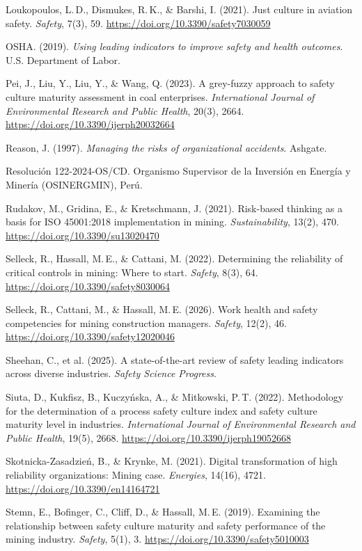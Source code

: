 \documentclass[12pt,a4paper]{article}
\begin{document}
Loukopoulos, L.\,D., Dismukes, R.\,K., \& Barshi, I. (2021). Just culture in aviation safety. \textit{Safety}, 7(3), 59. \url{https://doi.org/10.3390/safety7030059}

OSHA. (2019). \textit{Using leading indicators to improve safety and health outcomes}. U.S. Department of Labor.

Pei, J., Liu, Y., Liu, Y., \& Wang, Q. (2023). A grey-fuzzy approach to safety culture maturity assessment in coal enterprises. \textit{International Journal of Environmental Research and Public Health}, 20(3), 2664. \url{https://doi.org/10.3390/ijerph20032664}

Reason, J. (1997). \textit{Managing the risks of organizational accidents}. Ashgate.

Resolución 122-2024-OS/CD. Organismo Supervisor de la Inversión en Energía y Minería (OSINERGMIN), Perú.

Rudakov, M., Gridina, E., \& Kretschmann, J. (2021). Risk-based thinking as a basis for ISO 45001:2018 implementation in mining. \textit{Sustainability}, 13(2), 470. \url{https://doi.org/10.3390/su13020470}

Selleck, R., Hassall, M.\,E., \& Cattani, M. (2022). Determining the reliability of critical controls in mining: Where to start. \textit{Safety}, 8(3), 64. \url{https://doi.org/10.3390/safety8030064}

Selleck, R., Cattani, M., \& Hassall, M.\,E. (2026). Work health and safety competencies for mining construction managers. \textit{Safety}, 12(2), 46. \url{https://doi.org/10.3390/safety12020046}

Sheehan, C., et al. (2025). A state-of-the-art review of safety leading indicators across diverse industries. \textit{Safety Science Progress}.

Siuta, D., Kukfisz, B., Kuczy\'nska, A., \& Mitkowski, P.\,T. (2022). Methodology for the determination of a process safety culture index and safety culture maturity level in industries. \textit{International Journal of Environmental Research and Public Health}, 19(5), 2668. \url{https://doi.org/10.3390/ijerph19052668}

Skotnicka-Zasadzie\'n, B., \& Krynke, M. (2021). Digital transformation of high reliability organizations: Mining case. \textit{Energies}, 14(16), 4721. \url{https://doi.org/10.3390/en14164721}

Stemn, E., Bofinger, C., Cliff, D., \& Hassall, M.\,E. (2019). Examining the relationship between safety culture maturity and safety performance of the mining industry. \textit{Safety}, 5(1), 3. \url{https://doi.org/10.3390/safety5010003}
\end{document}
